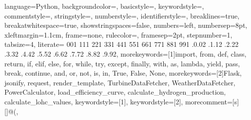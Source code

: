 
 {
    language=Python,
    backgroundcolor=\color{vscodeLightBackground},
    basicstyle=\fontsize{10}{15}\ttfamily\color{black},
    keywordstyle=\color{vscodeLightKeyword},
    commentstyle=\color{vscodeLightComment},
    stringstyle=\color{vscodeLightString},
    numberstyle=\tiny\color{vscodeLightLineNumber},
    identifierstyle=\color{black},
    breaklines=true,
    breakatwhitespace=true,
    showstringspaces=false,
    numbers=left,
    numbersep=8pt,
    xleftmargin=1.1cm,
    frame=none,
    rulecolor=\color{black},
    framesep=2pt,
    stepnumber=1,
    tabsize=4,
    literate=
        {0}{{\color{vscodeLightNumber}0}}1
        {1}{{\color{vscodeLightNumber}1}}1
        {2}{{\color{vscodeLightNumber}2}}1
        {3}{{\color{vscodeLightNumber}3}}1
        {4}{{\color{vscodeLightNumber}4}}1
        {5}{{\color{vscodeLightNumber}5}}1
        {6}{{\color{vscodeLightNumber}6}}1
        {7}{{\color{vscodeLightNumber}7}}1
        {8}{{\color{vscodeLightNumber}8}}1
        {9}{{\color{vscodeLightNumber}9}}1
        {.0}{{\color{vscodeLightNumber}.0}}2
        {.1}{{\color{vscodeLightNumber}.1}}2
        {.2}{{\color{vscodeLightNumber}.2}}2
        {.3}{{\color{vscodeLightNumber}.3}}2
        {.4}{{\color{vscodeLightNumber}.4}}2
        {.5}{{\color{vscodeLightNumber}.5}}2
        {.6}{{\color{vscodeLightNumber}.6}}2
        {.7}{{\color{vscodeLightNumber}.7}}2
        {.8}{{\color{vscodeLightNumber}.8}}2
        {.9}{{\color{vscodeLightNumber}.9}}2,
    morekeywords=[1]{import, from, def, class, return, if, elif, else, for, while, try, except, finally, with, as, lambda, yield, pass, break, continue, and, or, not, is, in, True, False, None},
    morekeywords=[2]{Flask, jsonify, request, render_template, TurbineDataFetcher, WeatherDataFetcher, PowerCalculator, load_efficiency_curve, calculate_hydrogen_production, calculate_lohc_values},
    keywordstyle=[1]\color{vscodeLightKeyword},
    keywordstyle=[2]\color{vscodeLightIdentifier},
    morecomment=[s][\color{vscodeLightDecorator}]{@}{(},
}

